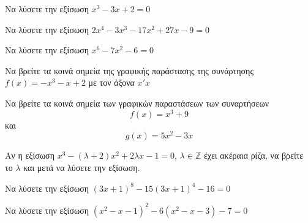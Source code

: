 \documentclass{../presentation}
\begin{document}
\begin{askisi}
  Να λύσετε την εξίσωση $x^3-3x+2=0$


\end{askisi}

\begin{askisi}
  Να λύσετε την εξίσωση $2x^4-3x^3-17x^2+27x-9=0$


\end{askisi}

\begin{askisi}
  Να λύσετε την εξίσωση $x^6-7x^2-6=0$


\end{askisi}

\begin{askisi}
  Να βρείτε τα κοινά σημεία της γραφικής παράστασης της συνάρτησης $f(x)=-x^3-x+2$ με τον άξονα $x'x$


\end{askisi}

\begin{askisi}
  Να βρείτε τα κοινά σημεία των γραφικών παραστάσεων των συναρτήσεων $$f(x)=x^3+9$$ και $$g(x)=5x^2-3x$$


\end{askisi}

\begin{askisi}
  Αν η εξίσωση $x^3-(λ+2)x^2+2λx-1=0$, $λ\in\mathbb{Z}$ έχει ακέραια ρίζα, να βρείτε το $λ$ και μετά να λύσετε την εξίσωση.


\end{askisi}

\begin{askisi}
  Να λύσετε την εξίσωση $(3x+1)^8-15(3x+1)^4-16=0$


\end{askisi}

\begin{askisi}
  Να λύσετε την εξίσωση $(x^2-x-1)^2-6(x^2-x-3)-7=0$


\end{askisi}
\end{document}
